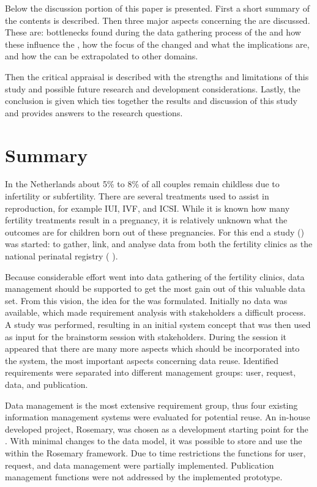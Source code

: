Below the discussion portion of this paper is presented.
First a short summary of the contents is described.
Then three major aspects concerning the \ivfsystem{} are discussed.
These are: bottlenecks found during the data gathering process of the \projectdata{} and how these influence the \ivfsystem{}, how the focus of the \ivfsystem{} changed and what the implications are, and how the \ivfsystem{} can be extrapolated to other domains.

Then the critical appraisal is described with the strengths and limitations of this study and possible future research and development considerations.
Lastly, the conclusion is given which ties together the results and discussion of this study and provides answers to the research questions.

\section{Summary}

In the Netherlands about 5\% to 8\% of all couples remain childless due to infertility or subfertility.
There are several treatments used to assist in reproduction, for example IUI, IVF, and ICSI.
While it is known how many fertility treatments result in a pregnancy, it is relatively unknown what the outcomes are for children born out of these pregnancies.
For this end a study (\project{}) was started: to gather, link, and analyse data from both the fertility clinics as the national perinatal registry (\ie{} \PRN{}).

Because considerable effort went into data gathering of the fertility clinics, data management should be supported to get the most gain out of this valuable data set.
From this vision, the idea for the \ivfsystem{} was formulated.
Initially no data was available, which made requirement analysis with stakeholders a difficult process.
A study was performed, resulting in an initial system concept that was then used as input for the brainstorm session with stakeholders.
During the session it appeared that there are many more aspects which should be incorporated into the system, the most important aspects concerning data reuse.
Identified requirements were separated into different management groups: user, request, data, and publication.

Data management is the most extensive requirement group, thus four existing information management systems were evaluated for potential reuse.
An in-house developed project, Rosemary, was chosen as a development starting point for the \ivfsystem{}.
With minimal changes to the data model, it was possible to store and use the \projectdata{} within the Rosemary framework.
Due to time restrictions the functions for user, request, and data management were partially implemented.
Publication management functions were not addressed by the implemented prototype.


